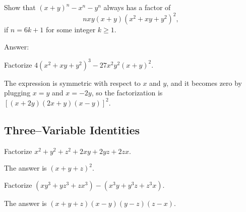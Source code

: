 \documentclass[12pt,a4paper]{memoir}
\theoremstyle{definition}
\begin{document}
\begin{tcolorbox}
	\begin{question}
		Show that $(x+y)^n - x^n - y^n$ always has a factor of \[nxy(x+y)(x^2+xy+y^2)^2,\] if $n=6k+1$ for some integer $k\geq 1$.
	\end{question}
\end{tcolorbox}

\begin{solution}
	Answer: 
\end{solution}



\begin{tcolorbox}
	\begin{question}
		Factorize $4(x^2+xy+y^2)^3 - 27x^2y^2(x+y)^2$.
	\end{question}
\end{tcolorbox}

\begin{solution}[name=Solution by Parviz Shahriari]
	The expression is symmetric with respect to $x$ and $y$, and it becomes zero by plugging $x=y$ and $x=-2y$, so the factorization is $[(x+2y)(2x+y)(x-y)]^2$.
\end{solution}


\newpage
\subsection{Three--Variable Identities}


\begin{tcolorbox}
	\begin{question}
		Factorize $x^2+y^2+z^2+2xy+2yz+2zx$.
	\end{question}
\end{tcolorbox}

\begin{solution}
	The answer is $(x+y+z)^2$.
\end{solution}

\begin{tcolorbox}
	\begin{question}
		Factorize $(xy^3+yz^3+zx^3) - (x^3y+y^3z+z^3x)$.
	\end{question}
\end{tcolorbox}

\begin{solution}
	The answer is $(x+y+z)(x-y)(y-z)(z-x)$.
\end{solution}
\end{document}
